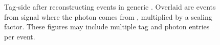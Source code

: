 \begin{figure}[htbp!]
    \centering
    \caption{\label{fig:sigprob_after_reco} Tag-side \feiProb after reconstructing \BtoXsgamma events in generic \MC.
    Overlaid are events from signal \MC where the photon comes from \BtoXsgamma, multiplied by a scaling factor.
    These figures may include multiple tag and photon entries per event.
    }
\end{figure}

